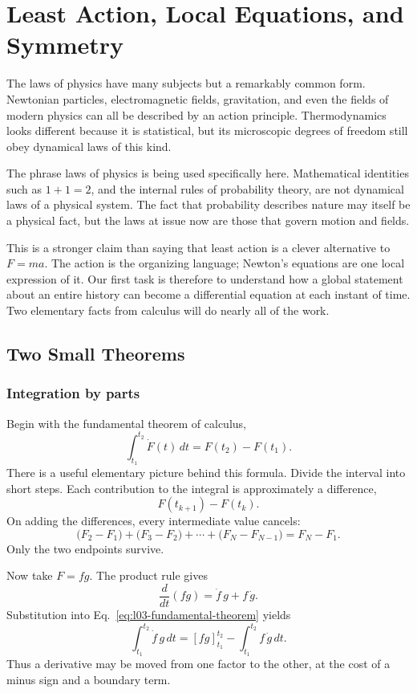 \chapter{Least Action, Local Equations, and Symmetry}

The laws of physics have many subjects but a remarkably common form. Newtonian
particles, electromagnetic fields, gravitation, and even the fields of modern
physics can all be described by an action principle. Thermodynamics looks
different because it is statistical, but its microscopic degrees of freedom
still obey dynamical laws of this kind.

The phrase laws of physics is being used specifically here. Mathematical
identities such as \(1+1=2\), and the internal rules of probability theory, are
not dynamical laws of a physical system. The fact that probability describes
nature may itself be a physical fact, but the laws at issue now are those that
govern motion and fields.

This is a stronger claim than saying that least action is a clever alternative
to \(F=ma\). The action is the organizing language; Newton's equations are one
local expression of it. Our first task is therefore to understand how a global
statement about an entire history can become a differential equation at each
instant of time. Two elementary facts from calculus will do nearly all of the
work.

\section{Two Small Theorems}

\subsection{Integration by parts}

Begin with the fundamental theorem of calculus,
\begin{equation}
 \int_{t_1}^{t_2}\dot F(t)\,dt=F(t_2)-F(t_1).
 \label{eq:l03-fundamental-theorem}
\end{equation}
There is a useful elementary picture behind this formula. Divide the interval
into short steps. Each contribution to the integral is approximately a
difference,
\[
 F(t_{k+1})-F(t_k).
\]
On adding the differences, every intermediate value cancels:
\[
 \bigl(F_2-F_1\bigr)+\bigl(F_3-F_2\bigr)+\cdots
   +\bigl(F_N-F_{N-1}\bigr)=F_N-F_1.
\]
Only the two endpoints survive.

Now take \(F=fg\). The product rule gives
\begin{equation}
 \frac{d}{dt}(fg)=\dot f\,g+f\,\dot g.
\end{equation}
Substitution into Eq.~\eqref{eq:l03-fundamental-theorem} yields
\begin{equation}
 \int_{t_1}^{t_2}\dot f\,g\,dt
 =
 [fg]_{t_1}^{t_2}
 -
 \int_{t_1}^{t_2}f\,\dot g\,dt.
 \label{eq:l03-integration-by-parts}
\end{equation}
Thus a derivative may be moved from one factor to the other, at the cost of a
minus sign and a boundary term.

